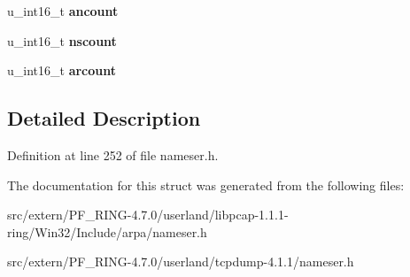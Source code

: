 \begin{DoxyCompactItemize}
\item 
\hypertarget{struct_h_e_a_d_e_r_a22ac07f73595c25f5fdd6f203562d102}{
u\_\-int16\_\-t {\bfseries ancount}}
\label{struct_h_e_a_d_e_r_a22ac07f73595c25f5fdd6f203562d102}

\item 
\hypertarget{struct_h_e_a_d_e_r_a828e415c74eeec048cfcdee47e5312ce}{
u\_\-int16\_\-t {\bfseries nscount}}
\label{struct_h_e_a_d_e_r_a828e415c74eeec048cfcdee47e5312ce}

\item 
\hypertarget{struct_h_e_a_d_e_r_ab71a9e96ec8c1c508987e26654899aa3}{
u\_\-int16\_\-t {\bfseries arcount}}
\label{struct_h_e_a_d_e_r_ab71a9e96ec8c1c508987e26654899aa3}

\end{DoxyCompactItemize}


\subsection{Detailed Description}


Definition at line 252 of file nameser.h.



The documentation for this struct was generated from the following files:\begin{DoxyCompactItemize}
\item 
src/extern/PF\_\-RING-\/4.7.0/userland/libpcap-\/1.1.1-\/ring/Win32/Include/arpa/nameser.h\item 
src/extern/PF\_\-RING-\/4.7.0/userland/tcpdump-\/4.1.1/nameser.h\end{DoxyCompactItemize}
